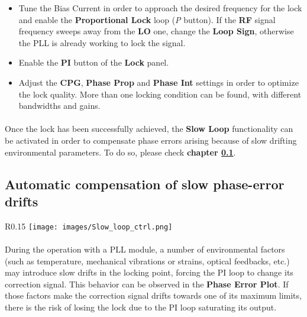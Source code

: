 \begin{itemize}
    \item Tune the Bias Current in order to approach the desired frequency for the lock and enable the \textbf{Proportional Lock} loop (\textit{P} button). If the \textbf{RF} signal frequency sweeps away from the \textbf{LO} one, change the \textbf{Loop Sign}, otherwise the PLL is already working to lock the signal.
    
    \item Enable the \textbf{PI} button of the \textbf{Lock} panel.
    
    \item Adjust the \textbf{CPG}, \textbf{Phase Prop} and \textbf{Phase Int} settings in order to optimize the lock quality. More than one locking condition can be found, with different bandwidths and gains.
\end{itemize}


\paragraph{} Once the lock has been successfully achieved, the \textbf{Slow Loop} functionality can be activated in order to compensate phase errors arising because of slow drifting environmental parameters. To do so, please check \textbf{chapter \ref{Slow_loop_chapter}}.



\iffalse
\subsection{Automatic compensation of slow phase-error drifts}  \label{Slow_loop_chapter}
\begin{wrapfigure}{R}{0.15\textwidth}
    \vspace{-20pt}
    \texttt{[image: images/Slow\_loop\_ctrl.png]}
\end{wrapfigure}
\paragraph{}During the operation with a PLL module, a number of environmental factors (such as temperature, mechanical vibrations or strains, optical feedbacks, etc.) may introduce slow drifts in the locking point, forcing the PI loop to change its correction signal. This behavior can be observed in the \textbf{Phase Error Plot}. If those factors make the correction signal drifts towards one of its maximum limits, there is the risk of losing the lock due to the PI loop saturating its output.

